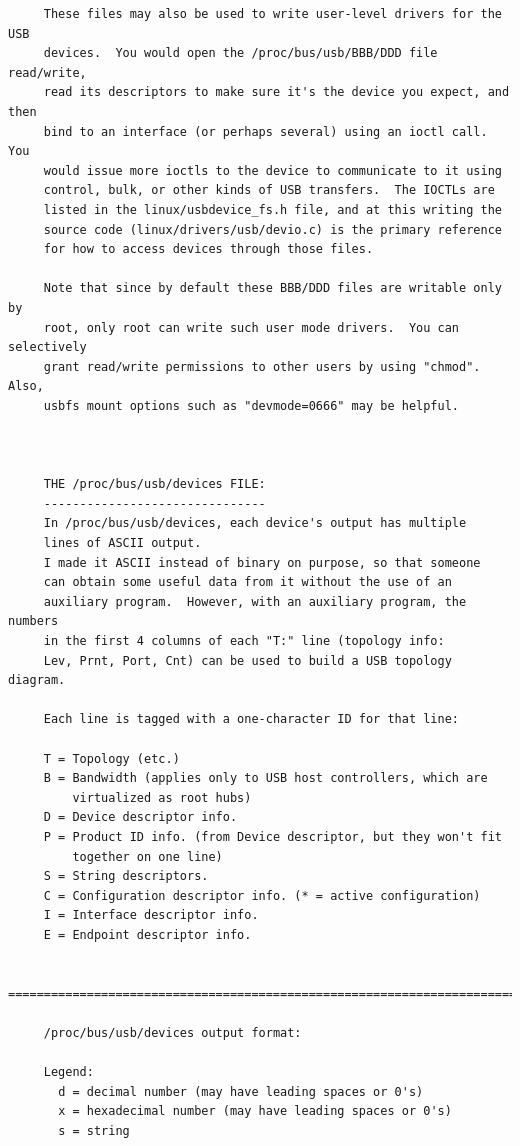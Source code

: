 {{{{{{{{{{{{{{{{{\begin{verbatim}
     These files may also be used to write user-level drivers for the USB
     devices.  You would open the /proc/bus/usb/BBB/DDD file read/write,
     read its descriptors to make sure it's the device you expect, and then
     bind to an interface (or perhaps several) using an ioctl call.  You
     would issue more ioctls to the device to communicate to it using
     control, bulk, or other kinds of USB transfers.  The IOCTLs are
     listed in the linux/usbdevice_fs.h file, and at this writing the
     source code (linux/drivers/usb/devio.c) is the primary reference
     for how to access devices through those files.
     
     Note that since by default these BBB/DDD files are writable only by
     root, only root can write such user mode drivers.  You can selectively
     grant read/write permissions to other users by using "chmod".  Also,
     usbfs mount options such as "devmode=0666" may be helpful.
     
     
     
     THE /proc/bus/usb/devices FILE:
     -------------------------------
     In /proc/bus/usb/devices, each device's output has multiple
     lines of ASCII output.
     I made it ASCII instead of binary on purpose, so that someone
     can obtain some useful data from it without the use of an
     auxiliary program.  However, with an auxiliary program, the numbers
     in the first 4 columns of each "T:" line (topology info:
     Lev, Prnt, Port, Cnt) can be used to build a USB topology diagram.
     
     Each line is tagged with a one-character ID for that line:
     
     T = Topology (etc.)
     B = Bandwidth (applies only to USB host controllers, which are
         virtualized as root hubs)
     D = Device descriptor info.
     P = Product ID info. (from Device descriptor, but they won't fit
         together on one line)
     S = String descriptors.
     C = Configuration descriptor info. (* = active configuration)
     I = Interface descriptor info.
     E = Endpoint descriptor info.
     
     =======================================================================
     
     /proc/bus/usb/devices output format:
     
     Legend:
       d = decimal number (may have leading spaces or 0's)
       x = hexadecimal number (may have leading spaces or 0's)
       s = string
     

\end{verbatim}}}}}}}}}}}}}}}}}}
